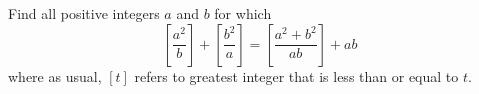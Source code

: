 Find all positive integers $a$ and $b$ for which
\[ \left[\frac{a^2}{b}\right] + \left[\frac{b^2}{a}\right] = \left[\frac{a^2+b^2}{ab}\right] + ab \]
where as usual, $[t]$ refers to greatest integer that is less than or equal to $t$.
